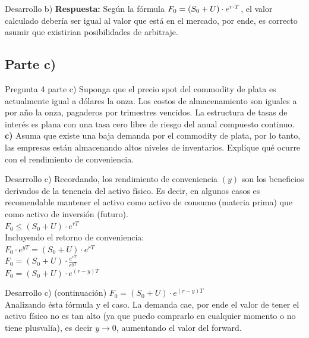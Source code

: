 \documentclass{beamer}
\newif\ifpresentacion
\newcommand{\pausa}{\ifpresentacion\pause\fi}
\begin{document}
  \begin{frame}{Desarrollo b)}
  \justify
  \Large
  \textbf{Respuesta:}  
  Según la fórmula \(F_0 = \left(S_0+U \right) \cdot{e^{r \cdot T}}\), el valor calculado debería ser igual al valor que está en el mercado,
  por ende, es correcto asumir que existirian posibilidades de arbitraje.
  \end{frame}

  \subsection{Parte c)}

  \begin{frame}{Pregunta 4 parte c)}
    \justify
    \large
    Suponga que el precio spot del commodity de plata es actualmente igual a \dinero{\plata} dólares  
    la onza. Los costos de almacenamiento son iguales a \dinero{\almacenamiento} por año la onza, pagaderos por
    trimestres vencidos. La estructura de tasas de interés es plana con una tasa cero libre 
    de riesgo del \porcentaje{\tlr} anual compuesto continuo.\\
    \vspace{.5em}
    \textbf{c)}	Asuma que existe una baja demanda por el commodity de plata, por lo tanto, 
    las empresas están almacenando altos niveles de inventarios. 
    Explique qué ocurre con el rendimiento de conveniencia. 
  \end{frame}

  \begin{frame}{Desarrollo c)}
    \justify
    \large
    Recordando, los rendimiento de conveniencia $(y)$ son los beneficios derivados de la tenencia del activo físico.
    Es decir, en algunos casos es recomendable mantener el activo como activo de consumo (materia prima) que como activo
    de inversión (futuro).\\
    \(F_0 \leq \left(S_0+U\right) \cdot e^{rT} \)\\
    \pausa
    Incluyendo el retorno de conveniencia:\\
    \(F_0 \cdot e^{yT}= \left(S_0+U\right) \cdot e^{rT} \)\\
    \pausa
    \(F_0 = \left(S_0+U\right) \cdot \frac{e^{rT}}{e^{yT}}  \)\\
    \pausa
    \(F_0 = \left(S_0+U\right) \cdot e^{\left(r-y\right)T} \)\\
  \end{frame}
    
  \begin{frame}{Desarrollo c) (continuación)}
    \justify
    \Large
    \(F_0 = \left(S_0+U\right) \cdot e^{\left(r-y\right)T} \)\\
  \vspace{1em} 
    Analizando ésta fórmula y el caso. La demanda cae, por ende el valor de tener el activo físico no es 
    tan alto (ya que puedo comprarlo en cualquier momento o no tiene plusvalía), es decir $y \rightarrow 0$, 
    aumentando el valor del forward.


  \end{frame}
  
\end{document}
